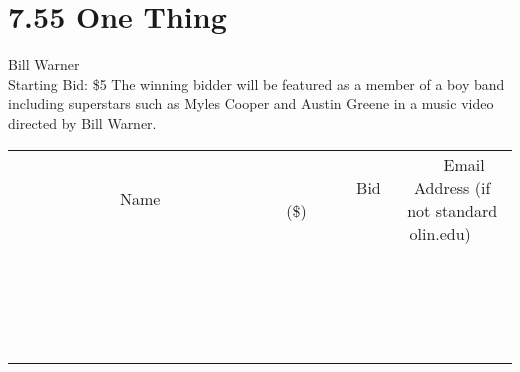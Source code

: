 \documentclass[11pt]{article}
\begin{document}
\section*{7.55 One Thing}
Bill Warner
\\
Starting Bid: \$5
\newline
The winning bidder will be featured as a member of a boy band including superstars such as Myles Cooper and Austin Greene in a music video directed by Bill Warner.
\\[3ex]
\begin{tabular}{c c c}
~~~~~~~~~~~~~Name~~~~~~~~~~~~~ & ~~~~~~~~~Bid (\$)~~~~~~~~~  & ~~~Email Address (if not standard olin.edu)~~~\\
 & & \\
\hline
 & & \\
\hline
 & & \\
\hline
 & & \\
\hline
 & & \\
\hline
 & & \\
\hline
 & & \\
\hline
 & & \\
\hline
 & & \\
\hline
 & & \\
\hline
 & & \\
\hline
 & & \\
\hline
 & & \\
\hline
 & & \\
\hline
 & & \\
\hline
 & & \\
\hline
 & & \\
\hline
 & & \\
\hline
 & & \\
\hline
\end{tabular}
\newpage
\end{document}
